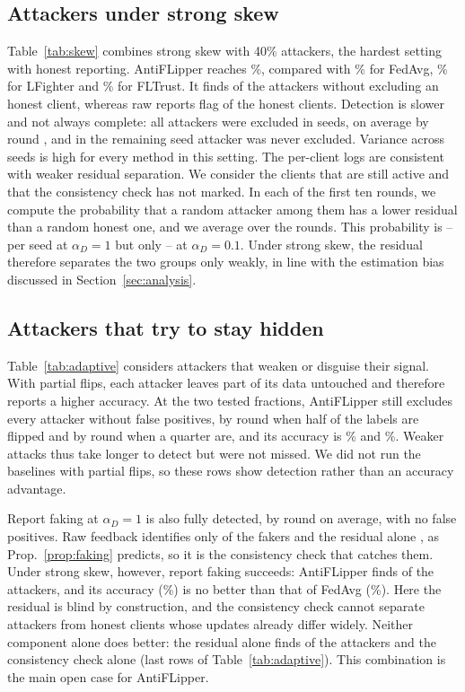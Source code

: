 \documentclass[conference]{IEEEtran}
\begin{document}
\subsection{Attackers under strong skew}

Table~\ref{tab:skew} combines strong skew with 40\% attackers, the hardest setting with honest reporting. AntiFLipper reaches \skewAcc\%, compared with \skewAccFedAvg\% for FedAvg, \skewAccLFighter\% for LFighter and \skewAccFLTrust\% for FLTrust. It finds \skewRecall{} of the attackers without excluding an honest client, whereas raw reports flag \skewFPRRaw{} of the honest clients. Detection is slower and not always complete: all attackers were excluded in \skewFull{} seeds, on average by round \skewDetHits, and in the remaining seed \skewMissed{} attacker was never excluded. Variance across seeds is high for every method in this setting. The per-client logs are consistent with weaker residual separation. We consider the clients that are still active and that the consistency check has not marked. In each of the first ten rounds, we compute the probability that a random attacker among them has a lower residual than a random honest one, and we average over the rounds. This probability is \aucHighMin--\aucHighMax{} per seed at $\alpha_D{=}1$ but only \aucLowMin--\aucLowMax{} at $\alpha_D{=}0.1$. Under strong skew, the residual therefore separates the two groups only weakly, in line with the estimation bias discussed in Section~\ref{sec:analysis}.

\subsection{Attackers that try to stay hidden}

Table~\ref{tab:adaptive} considers attackers that weaken or disguise their signal. With partial flips, each attacker leaves part of its data untouched and therefore reports a higher accuracy. At the two tested fractions, AntiFLipper still excludes every attacker without false positives, by round \pfDetHalf{} when half of the labels are flipped and by round \pfDetQuarter{} when a quarter are, and its accuracy is \pfAccHalf\% and \pfAccQuarter\%. Weaker attacks thus take longer to detect but were not missed. We did not run the baselines with partial flips, so these rows show detection rather than an accuracy advantage.

Report faking at $\alpha_D{=}1$ is also fully detected, by round \fakeDet{} on average, with no false positives. Raw feedback identifies only \fakeRecallRaw{} of the fakers and the residual alone \fakeRecallCROnly, as Prop.~\ref{prop:faking} predicts, so it is the consistency check that catches them. Under strong skew, however, report faking succeeds: AntiFLipper finds \fsRecall{} of the attackers, and its accuracy (\fsAcc\%) is no better than that of FedAvg (\fsAccFedAvg\%). Here the residual is blind by construction, and the consistency check cannot separate attackers from honest clients whose updates already differ widely. Neither component alone does better: the residual alone finds \fsRecallCR{} of the attackers and the consistency check alone \ccSkewRecall{} (last rows of Table~\ref{tab:adaptive}). This combination is the main open case for AntiFLipper.
\end{document}

